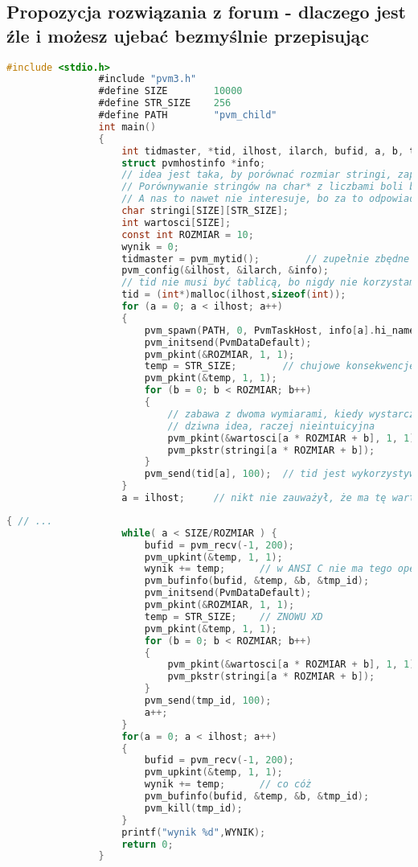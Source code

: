 		\subsection{Propozycja rozwiązania z forum - dlaczego jest źle i możesz ujebać bezmyślnie przepisując}
			\begin{lstlisting}[language=C]
				#include <stdio.h>
				#include "pvm3.h"
				#define SIZE        10000
				#define STR_SIZE    256
				#define PATH        "pvm_child"
				int main()
				{
					int tidmaster, *tid, ilhost, ilarch, bufid, a, b, temp, wynik;
					struct pvmhostinfo *info;
					// idea jest taka, by porównać rozmiar stringi, zapisany w drugim wymiarze, z wartością w 'wartosci'. Treść zadania mówi o dwóch tabelach w jednym wymierze, więc średnie to.
					// Porównywanie stringów na char* z liczbami boli bez gotowych funkcji, co? :P
					// A nas to nawet nie interesuje, bo za to odpowiada potomek, zatem mamy przykład popieprzenia z poplątaniem XD
					char stringi[SIZE][STR_SIZE];
					int wartosci[SIZE];
					const int ROZMIAR = 10;
					wynik = 0;
					tidmaster = pvm_mytid();		// zupełnie zbędne
					pvm_config(&ilhost, &ilarch, &info);
					// tid nie musi być tablicą, bo nigdy nie korzystamy z innego, niż aktualnie wykorzystywany
					tid = (int*)malloc(ilhost,sizeof(int));
					for (a = 0; a < ilhost; a++)
					{
						pvm_spawn(PATH, 0, PvmTaskHost, info[a].hi_name, 1, &tid[a]);
						pvm_initsend(PvmDataDefault);
						pvm_pkint(&ROZMIAR, 1, 1);
						temp = STR_SIZE;		// chujowe konsekwencje trzymania stałej przez define - brak adresu, hłehłe
						pvm_pkint(&temp, 1, 1);
						for (b = 0; b < ROZMIAR; b++)
						{
							// zabawa z dwoma wymiarami, kiedy wystarczy jeden
							// dziwna idea, raczej nieintuicyjna
							pvm_pkint(&wartosci[a * ROZMIAR + b], 1, 1);
							pvm_pkstr(stringi[a * ROZMIAR + b]);
						}
						pvm_send(tid[a], 100);	// tid jest wykorzystywany tylko w tej pętli, tabela nie sensu
					}
					a = ilhost;		// nikt nie zauważył, że ma tę wartość po wyjściu z pętli?
			\end{lstlisting}
			\newpage
			\begin{lstlisting}[language=C]
				{ // ...
					while( a < SIZE/ROZMIAR ) {
						bufid = pvm_recv(-1, 200);
						pvm_upkint(&temp, 1, 1);
						wynik += temp;		// w ANSI C nie ma tego operatora
						pvm_bufinfo(bufid, &temp, &b, &tmp_id);
						pvm_initsend(PvmDataDefault);
						pvm_pkint(&ROZMIAR, 1, 1);
						temp = STR_SIZE;	// ZNOWU XD
						pvm_pkint(&temp, 1, 1);
						for (b = 0; b < ROZMIAR; b++)
						{
							pvm_pkint(&wartosci[a * ROZMIAR + b], 1, 1);
							pvm_pkstr(stringi[a * ROZMIAR + b]);
						}
						pvm_send(tmp_id, 100);
						a++;
					}
					for(a = 0; a < ilhost; a++)
					{
						bufid = pvm_recv(-1, 200);
						pvm_upkint(&temp, 1, 1);
						wynik += temp;		// co cóż
						pvm_bufinfo(bufid, &temp, &b, &tmp_id);
						pvm_kill(tmp_id);
					}
					printf("wynik %d",WYNIK);
					return 0;
				}
			\end{lstlisting}
		\newpage
		
